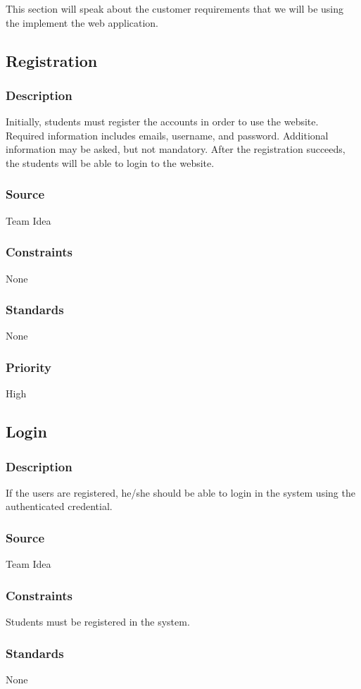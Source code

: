 This section will speak about the customer requirements that we will be using the implement the web application.

\subsection{Registration}
\subsubsection{Description}
Initially, students must register the accounts in order to use the website. Required information includes emails, username, and password. Additional information may be asked, but not mandatory. After the registration succeeds, the students will be able to login to the website.
\subsubsection{Source}
Team Idea
\subsubsection{Constraints}
None
\subsubsection{Standards}
None
\subsubsection{Priority}
High

\subsection{Login}
\subsubsection{Description}
If the users are registered, he/she should be able to login in the system using the authenticated credential.
\subsubsection{Source}
Team Idea
\subsubsection{Constraints}
Students must be registered in the system.
\subsubsection{Standards}
None
